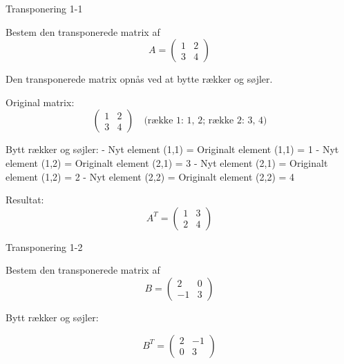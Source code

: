 \documentclass{article}
\begin{document}

\tableofcontents
\newpage

\begin{exercise}{Transponering 1-1}

Bestem den transponerede matrix af
\[
A = \begin{pmatrix} 1 & 2 \\ 3 & 4 \end{pmatrix}
\]


\hint

Den transponerede matrix opnås ved at bytte rækker og søjler.

\hint

Original matrix:
\[
\begin{pmatrix} 1 & 2 \\ 3 & 4 \end{pmatrix}  \quad \text{(række 1: 1, 2; række 2: 3, 4)}
\]

\hint

Bytt rækker og søjler:
- Nyt element (1,1) = Originalt element (1,1) = 1
- Nyt element (1,2) = Originalt element (2,1) = 3
- Nyt element (2,1) = Originalt element (1,2) = 2
- Nyt element (2,2) = Originalt element (2,2) = 4

\hint

Resultat:
\[
A^T = \begin{pmatrix} 1 & 3 \\ 2 & 4 \end{pmatrix}
\]

\end{exercise}

\newpage

\begin{exercise}{Transponering 1-2}

Bestem den transponerede matrix af
\[
B = \begin{pmatrix} 2 & 0 \\ -1 & 3 \end{pmatrix}
\]


\hint

Bytt rækker og søjler:

\hint
\[
B^T = \begin{pmatrix} 2 & -1 \\ 0 & 3 \end{pmatrix}
\]

\end{exercise}
\end{document}
